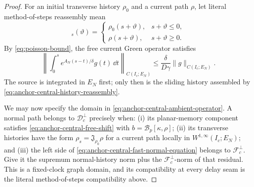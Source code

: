 \begin{proof}
For an initial transverse history \(\rho_0\) and a current path \(\rho\),
let literal method-of-steps reassembly mean
\begin{equation}
 [\mathfrak J_{\rho_0}\rho]_s(\vartheta)
 =\begin{cases}
   \rho_0(s+\vartheta),&s+\vartheta\le0,\\
   \rho(s+\vartheta),&s+\vartheta\ge0.
  \end{cases}                                      \label{eq:anchor-central-history-reassembly}
\end{equation}
By \cref{eq:poisson-bound}, the free current Green operator satisfies
\begin{equation}
 \left\|\int_0^s e^{A_N(s-t)/\delta}g(t)\,\dd t\right\|_{C(I_c;E_N)}
 \le\frac{\delta}{D\gamma}\|g\|_{C(I_c;E_N)}.     \label{eq:anchor-central-current-Green-bound}
\end{equation}
The source is integrated in \(E_N\) first; only then is the sliding history
assembled by \cref{eq:anchor-central-history-reassembly}.

We may now specify the domain in
\cref{eq:anchor-central-ambient-operator}.  A normal path belongs to
\(\mathscr D_c^\perp\) precisely when: (i) its planar-memory component
satisfies \cref{eq:anchor-central-free-shift} with
\(b=\mathscr B_p[\kappa,\rho]\); (ii) its transverse histories have the
form \(\rho_s=\mathfrak J_{\rho_0}\rho\) for a current path locally in
\(W^{1,\infty}(I_c;E_N)\); and (iii) the left side of
\cref{eq:anchor-central-fast-normal-equation} belongs to
\(\mathscr F_c^\perp\).  Give it the supremum normal-history norm plus the
\(\mathscr F_c^\perp\)-norm of that residual.  This is a fixed-clock graph
domain, and its compatibility at every delay seam is the literal
method-of-steps compatibility above.


\end{proof}
